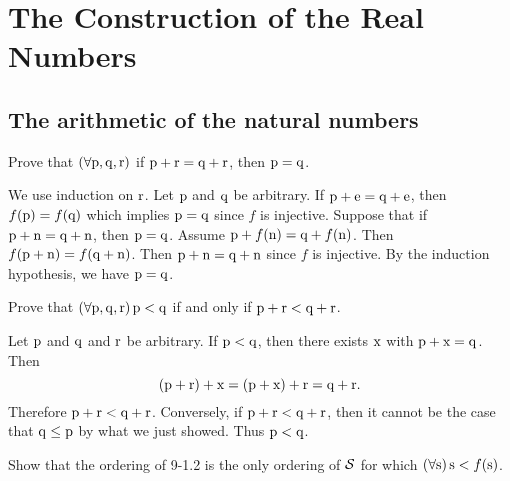 \chapter{The Construction of the Real Numbers}


\section{The arithmetic of the natural numbers}

\begin{exercise}
Prove that $(\forall \mathrm{p},\mathrm{q},\mathrm{r})$ if $\mathrm{p} + \mathrm{r} = \mathrm{q} + \mathrm{r}$,
then $\mathrm{p}=\mathrm{q}$.
\end{exercise}

\begin{solution}
We use induction on $\mathrm{r}$. Let $\mathrm{p}$ and $\mathrm{q}$ be arbitrary.
If $\mathrm{p} + \mathrm{e} = \mathrm{q} + \mathrm{e}$,
then $f(\mathrm{p})=f(\mathrm{q})$ which implies $\mathrm{p}=\mathrm{q}$ since $f$ is injective.
Suppose that if $\mathrm{p} + \mathrm{n} = \mathrm{q} + \mathrm{n}$, then $\mathrm{p}=\mathrm{q}$.
Assume $\mathrm{p} + f(\mathrm{n}) = \mathrm{q} + f(\mathrm{n})$.
Then $f(\mathrm{p} + \mathrm{n})=f(\mathrm{q} + \mathrm{n})$.
Then $\mathrm{p} + \mathrm{n}=\mathrm{q} + \mathrm{n}$ since $f$ is injective.
By the induction hypothesis, we have $\mathrm{p}=\mathrm{q}$.
\end{solution}

\begin{exercise}
Prove that $(\forall \mathrm{p},\mathrm{q},\mathrm{r})\thinspace \mathrm{p}<\mathrm{q}$ if and only if
$\mathrm{p} + \mathrm{r} < \mathrm{q} + \mathrm{r}$.
\end{exercise}

\begin{solution}
Let $\mathrm{p}$ and $\mathrm{q}$ and $\mathrm{r}$ be arbitrary.
If $\mathrm{p} < \mathrm{q}$, then there exists $\mathrm{x}$ with $\mathrm{p} + \mathrm{x} = \mathrm{q}$.
Then
\[(\mathrm{p} + \mathrm{r}) + \mathrm{x}=(\mathrm{p} + \mathrm{x}) + \mathrm{r} = \mathrm{q} + \mathrm{r}.\]
Therefore $\mathrm{p} + \mathrm{r} < \mathrm{q} + \mathrm{r}$.
Conversely, if $\mathrm{p} + \mathrm{r} < \mathrm{q} + \mathrm{r}$, then it cannot be the case that
$\mathrm{q} \leq \mathrm{p}$ by what we just showed. Thus $\mathrm{p} < \mathrm{q}$.
\end{solution}

\begin{exercise}
Show that the ordering of 9-1.2 is the only ordering of $\mathcal{S}$ for which
$(\forall \mathrm{s})\thinspace \mathrm{s} < f(\mathrm{s})$.
\end{exercise}

